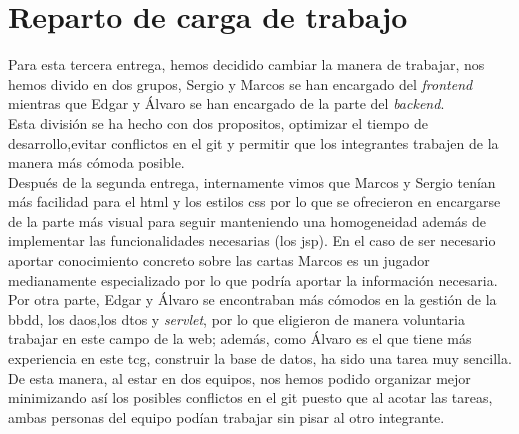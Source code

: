 \documentclass[10pt]{article}
\begin{document}
	\section{Reparto de carga de trabajo}
	Para esta tercera entrega, hemos decidido cambiar la manera de trabajar, nos hemos divido en dos grupos, Sergio y Marcos se han encargado del \textit{frontend} mientras que Edgar y Álvaro se han encargado de la parte del \textit{backend}.\\
	Esta división se ha hecho con dos propositos, optimizar el tiempo de desarrollo,evitar conflictos en el git y permitir que los integrantes trabajen de la manera más cómoda posible.\\
	Después de la segunda entrega, internamente vimos que Marcos y Sergio tenían más facilidad para el html y los estilos css por lo que se ofrecieron en encargarse de la parte más visual para seguir manteniendo una homogeneidad además de implementar las funcionalidades necesarias (los jsp). En el caso de ser necesario aportar conocimiento concreto sobre las cartas Marcos es un jugador medianamente especializado por lo que podría aportar la información necesaria.\\
	Por otra parte, Edgar y Álvaro se encontraban más cómodos en la gestión de la bbdd, los daos,los dtos y \textit{servlet}, por lo que eligieron de manera voluntaria trabajar en este campo de la web; además, como Álvaro es el que tiene más experiencia en este tcg, construir la base de datos, ha sido una tarea muy sencilla.\\
	De esta manera, al estar en dos equipos, nos hemos podido organizar mejor minimizando así los posibles conflictos en el git puesto que al acotar las tareas, ambas personas del equipo podían trabajar sin pisar al otro integrante.
	
\end{document}
